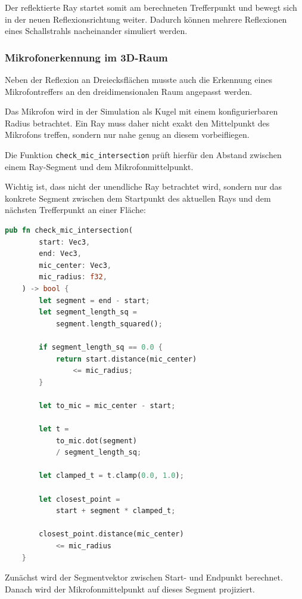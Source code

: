 \documentclass{article}
\begin{document}
    Der reflektierte Ray startet somit am berechneten Trefferpunkt und bewegt sich
    in der neuen Reflexionsrichtung weiter. Dadurch können mehrere Reflexionen
    eines Schallstrahls nacheinander simuliert werden.


    \subsubsection{Mikrofonerkennung im 3D-Raum}
    \label{subsubsec:3d-microphone}

    Neben der Reflexion an Dreiecksflächen musste auch die Erkennung eines
    Mikrofontreffers an den dreidimensionalen Raum angepasst werden.

    Das Mikrofon wird in der Simulation als Kugel mit einem konfigurierbaren
    Radius betrachtet. Ein Ray muss daher nicht exakt den Mittelpunkt des
    Mikrofons treffen, sondern nur nahe genug an diesem vorbeifliegen.

    Die Funktion \texttt{check\_mic\_intersection} prüft hierfür den Abstand
    zwischen einem Ray-Segment und dem Mikrofonmittelpunkt.

    Wichtig ist, dass nicht der unendliche Ray betrachtet wird, sondern nur das
    konkrete Segment zwischen dem Startpunkt des aktuellen Rays und dem nächsten
    Trefferpunkt an einer Fläche:

    \begin{lstlisting}[language=Rust]
    pub fn check_mic_intersection(
        start: Vec3,
        end: Vec3,
        mic_center: Vec3,
        mic_radius: f32,
    ) -> bool {
        let segment = end - start;
        let segment_length_sq =
            segment.length_squared();

        if segment_length_sq == 0.0 {
            return start.distance(mic_center)
                <= mic_radius;
        }

        let to_mic = mic_center - start;

        let t =
            to_mic.dot(segment)
            / segment_length_sq;

        let clamped_t = t.clamp(0.0, 1.0);

        let closest_point =
            start + segment * clamped_t;

        closest_point.distance(mic_center)
            <= mic_radius
    }
    \end{lstlisting}

    Zunächst wird der Segmentvektor zwischen Start- und Endpunkt berechnet.
    Danach wird der Mikrofonmittelpunkt auf dieses Segment projiziert.
\end{document}
